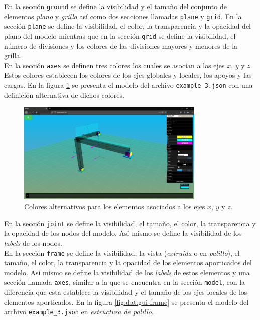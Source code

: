 En la sección \verb|ground| se define la visibilidad y el tamaño del conjunto de elementos \emph{plano} y \emph{grilla} así como dos secciones llamadas \verb|plane| y \verb|grid|. En la sección \verb|plane| se define la visibilidad, el color, la transparencia y la opacidad del plano del modelo mientras que en la sección \verb|grid| se define la visibilidad, el número de divisiones y los colores de las divisiones mayores y menores de la grilla.\\

En la sección \verb|axes| se definen tres colores los cuales se asocian a los ejes $ x $, $ y $ y $ z $. Estos colores establecen los colores de los ejes globales y locales, los apoyos y las cargas. En la figura \ref{fig:dat.gui-axes} se presenta el modelo del archivo \verb|example_3.json| con una definición alternativa de dichos colores.\\

\begin{figure}[ht]
  \centering
  \includegraphics[width=0.8\textwidth]{introduction/dat-gui-axes.png}
  \caption{Colores alternativos para los elementos asociados a los ejes $ x $, $ y $ y $ z $.}
  \label{fig:dat.gui-axes}
\end{figure}

En la sección \verb|joint| se define la visibilidad, el tamaño, el color, la transparencia y la opacidad de los nodos del modelo. Así mismo se define la visibilidad de los \emph{labels} de los nodos.\\

En la sección \verb|frame| se define la visibilidad, la vista (\emph{extruida} o en \emph{palillo}), el tamaño, el color, la transparencia y la opacidad de los elementos aporticados del modelo. Así mismo se define la visibilidad de los \emph{labels} de estos elementos y una sección llamada \verb|axes|, similar a la que se encuentra en la sección \verb|model|, con la diferencia que esta establece la visibilidad y el tamaño de los ejes locales de los elementos aporticados. En la figura \ref{fig:dat.gui-frame} se presenta el modelo del archivo \verb|example_3.json| en \emph{estructura de palillo}.\\

